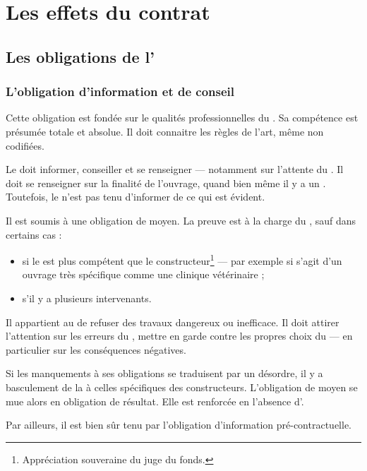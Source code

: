 	\section{Les effets du contrat}
	
		\subsection{Les obligations de l'\E}
		
			\subsubsection{L'obligation d'information et de conseil}
			
				Cette obligation est fondée sur le qualités professionnelles du \lo. Sa compétence est présumée totale et absolue. Il doit connaitre les règles de l'art, même non codifiées.
				
				Le \lo doit informer, conseiller et se renseigner --- notamment sur l'attente du \Mo. Il doit se renseigner sur la finalité de l'ouvrage, quand bien même il y a un \Moe. Toutefois, le \lo n'est pas tenu d'informer de ce qui est évident.
				
				Il est soumis à une obligation de moyen. La preuve est à la charge du \lo, sauf dans certains cas :
				\begin{itemize}
					\item si le \Mo est plus compétent que le constructeur\footnote{Appréciation souveraine du juge du fonds.} --- par exemple si s'agit d'un ouvrage très spécifique comme une clinique vétérinaire ; 
					
					\item s'il y a plusieurs intervenants.
				\end{itemize}
			
				Il appartient au \lo de refuser des travaux dangereux ou inefficace. Il doit attirer l'attention sur les erreurs du \Moe, mettre en garde contre les propres choix du \Mo --- en particulier sur les conséquences négatives.
				
				Si les manquements à ses obligations se traduisent par un désordre, il y a basculement de la \rcdc à celles spécifiques des constructeurs. L'obligation de moyen se mue alors en obligation de résultat. Elle est renforcée en l'absence d'\archi.
				
				\bigskip Par ailleurs, il est bien sûr tenu par l'obligation d'information pré-contractuelle.
				
